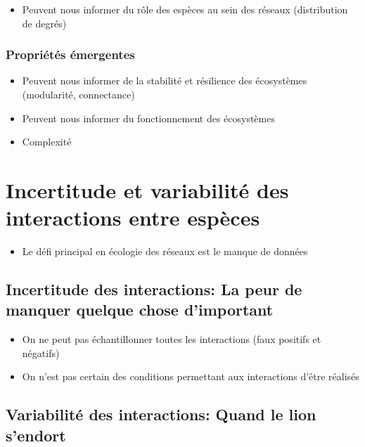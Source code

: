 \begin{itemize}
    \item Peuvent nous informer du rôle des espèces au sein des réseaux (distribution de degrés)
\end{itemize}

\subsubsection{Propriétés émergentes} 

\begin{itemize}
    \item Peuvent nous informer de la stabilité et résilience des écosystèmes (modularité, connectance)
    \item Peuvent nous informer du fonctionnement des écosystèmes 
    \item Complexité 
\end{itemize}




\section{Incertitude et variabilité des interactions entre espèces}

\begin{itemize}
    \item Le défi principal en écologie des réseaux est le manque de données
\end{itemize}

\subsection{Incertitude des interactions: La peur de manquer quelque chose d'important} 

\begin{itemize}
    \item On ne peut pas échantillonner toutes les interactions (faux positifs et négatifs)
    \item On n'est pas certain des conditions permettant aux interactions d'être réalisés
\end{itemize}

\subsection{Variabilité des interactions: Quand le lion s'endort} 

